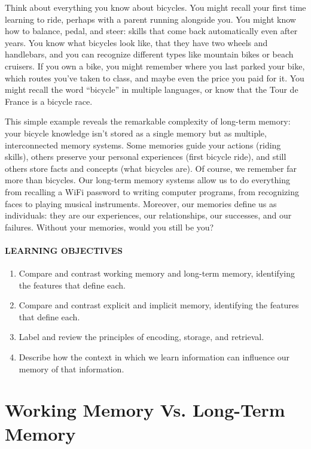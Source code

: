 \documentclass[
]{krantz}
\providecommand{\tightlist}{%
  \setlength{\itemsep}{0pt}\setlength{\parskip}{0pt}}
\begin{document}
Think about everything you know about bicycles. You might recall your first time learning to ride, perhaps with a parent running alongside you. You might know how to balance, pedal, and steer: skills that come back automatically even after years. You know what bicycles look like, that they have two wheels and handlebars, and you can recognize different types like mountain bikes or beach cruisers. If you own a bike, you might remember where you last parked your bike, which routes you've taken to class, and maybe even the price you paid for it. You might recall the word ``bicycle'' in multiple languages, or know that the Tour de France is a bicycle race.

This simple example reveals the remarkable complexity of long-term memory: your bicycle knowledge isn't stored as a single memory but as multiple, interconnected memory systems. Some memories guide your actions (riding skills), others preserve your personal experiences (first bicycle ride), and still others store facts and concepts (what bicycles are). Of course, we remember far more than bicycles. Our long-term memory systems allow us to do everything from recalling a WiFi password to writing computer programs, from recognizing faces to playing musical instruments. Moreover, our memories define us as individuals: they are our experiences, our relationships, our successes, and our failures. Without your memories, would you still be you?

\paragraph*{LEARNING OBJECTIVES}\label{learning-objectives-4}

\begin{enumerate}
\def\labelenumi{\arabic{enumi}.}
\tightlist
\item
  Compare and contrast working memory and long-term memory, identifying the features that define each.
\item
  Compare and contrast explicit and implicit memory, identifying the features that define each.
\item
  Label and review the principles of encoding, storage, and retrieval.
\item
  Describe how the context in which we learn information can influence our memory of that information.
\end{enumerate}

\section{Working Memory Vs. Long-Term Memory}\label{working-memory-vs.-long-term-memory}
\end{document}
